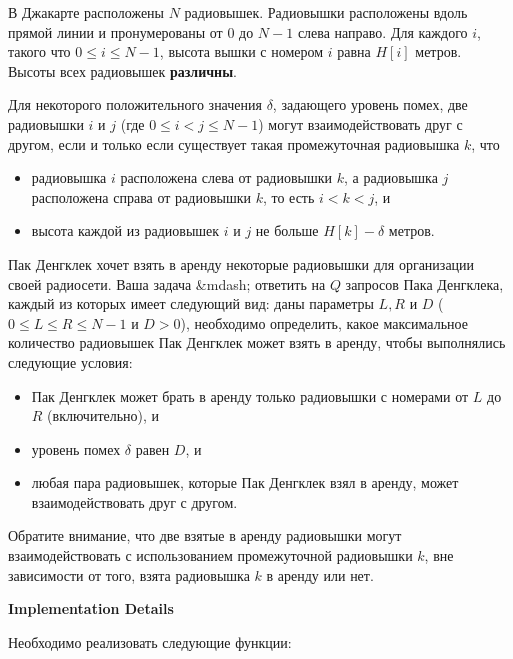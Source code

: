 В Джакарте расположены $N$ радиовышек.
Радиовышки расположены вдоль прямой линии и пронумерованы от $0$ до $N - 1$ слева направо.
Для каждого $i$, такого что $0 \le i \le N - 1$, высота вышки с номером $i$ равна $H[i]$ метров.
Высоты всех радиовышек \textbf{различны}.

Для некоторого положительного значения $\delta$, задающего уровень помех, две радиовышки $i$ и $j$ (где $0 \le i \lt j \le N - 1$) могут взаимодействовать друг с другом, если и только если существует такая промежуточная радиовышка $k$, что
\begin{itemize}
\item радиовышка $i$ расположена слева от радиовышки $k$, а радиовышка $j$ расположена справа от радиовышки $k$, то есть $i \lt k \lt j$, и
\item высота каждой из радиовышек $i$ и $j$ не больше $H[k] - \delta$ метров.
\end{itemize}

Пак Денгклек хочет взять в аренду некоторые радиовышки для организации своей радиосети.
Ваша задача &mdash; ответить на $Q$ запросов Пака Денгклека, каждый из которых имеет следующий вид:
даны параметры $L, R$ и $D$ ($0 \le L \le R \le N - 1$ и $D > 0$), необходимо определить, какое максимальное количество радиовышек Пак Денгклек может взять в аренду, чтобы выполнялись следующие условия:
\begin{itemize}
 \item Пак Денгклек может брать в аренду только радиовышки с номерами от $L$ до $R$ (включительно), и
 \item уровень помех $\delta$ равен $D$, и
 \item любая пара радиовышек, которые Пак Денгклек взял в аренду, может взаимодействовать друг с другом. 
\end{itemize}
Обратите внимание, что две взятые в аренду радиовышки могут взаимодействовать с использованием промежуточной радиовышки $k$, вне зависимости от того, взята радиовышка $k$ в аренду или нет.


\textbf{Implementation Details}

Необходимо реализовать следующие функции:

